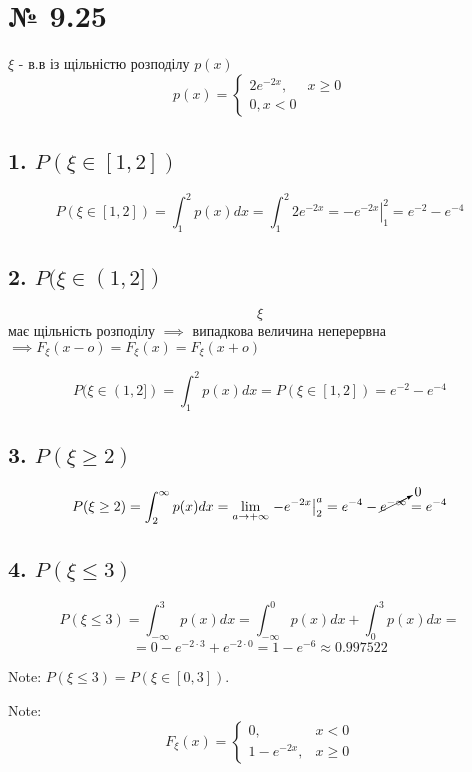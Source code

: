 \documentclass[11pt, a4paper]{article} %
\begin{document}

\section*{№ 9.25}
\begin{mdframed}
    $\xi$ - в.в із щільністю розподілу $p(x)$
    \begin{equation*}
        p(x) = \begin{cases}
            2e^{-2x},& x\ge 0\\
            0, x < 0
        \end{cases}
    \end{equation*}
\end{mdframed}



\subsection*{1. $P(\xi\in[1,2])$}
$$P(\xi\in[1,2]) = \int_1^2 p(x) dx = \int_1^2 2e^{-2x} = \left. -e^{-2x} \right|_1^2 = e^{-2}-e^{-4}$$


\subsection*{2. $P(\xi\in(1,2])$}
$$\xi$$ має щільність розподілу $\implies$ випадкова величина неперервна \\
$\implies F_\xi(x-o) = F_\xi(x) = F_\xi(x+o)$

$$P(\xi\in(1,2]) = \int_1^2 p(x) dx = P(\xi\in[1,2]) = e^{-2}-e^{-4}$$


\subsection*{3. $P(\xi\ge 2)$}
$$P(\xi\ge 2) = \int_2^\infty p(x) dx = \lim_{a\to +\infty} \left. -e^{-2x}\right|_2^a = e^{-4} - \cancelto{0}{e^{-\infty}} = e^{-4} $$

\subsection*{4. $P(\xi \le 3)$}
$$P(\xi\le 3) = \int_{-\infty}^3 p(x) dx = \int_{-\infty}^0 p(x) dx + \int_{0}^3 p(x) dx = $$
$$= 0 - e^{-2\cdot 3} + e^{-2\cdot 0} = 1-e^{-6} \approx 0.997522$$

Note: $P(\xi\le 3) = P(\xi \in [0,3])$.

Note: $$F_\xi (x) = \begin{cases}
    0, & x<0 \\
    1-e^{-2x}, & x \ge 0 
\end{cases}$$
\end{document}
